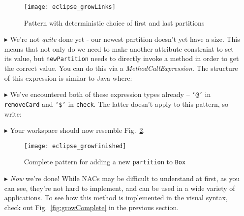 \begin{itemize}
\begin{figure}[htp]
\begin{center}
  \texttt{[image: eclipse\_growLinks]}
  \caption{Pattern  with deterministic choice of first and last partitions}
  \label{fig:growAllLinks}
\end{center}
\end{figure}

\item[$\blacktriangleright$] We're not \emph{quite} done yet - our newest partition doesn't yet have a size. This means that not only do we need to make
another attribute constraint to set its value, but \texttt{newPartition} needs to directly invoke a method in order to get the correct value. You can do this
via a \emph{MethodCallExpression}. The structure of this expression is similar to Java where:

\item[$\blacktriangleright$] We've encountered both of these expression types already -- \texttt{`@'} in \texttt{removeCard} and \texttt{`\$'} in
\texttt{check}. The latter doesn't apply to this pattern, so write: 

\item[$\blacktriangleright$] Your workspace should now resemble Fig.~\ref{fig:patternComplete}.

\vspace{0.5cm}

\begin{figure}[htp]
\begin{center}
  \texttt{[image: eclipse\_growFinished]}
  \caption{Complete pattern for adding a new \texttt{partition} to \texttt{Box}}
  \label{fig:patternComplete}
\end{center}
\end{figure}

\vspace{0.5cm}

\item[$\blacktriangleright$] \emph{Now} we're done! While NACs may be difficult to understand at first, as you can see, they're not hard to implement, and
can be used in a wide variety of applications. To see how this method is implemented in the visual syntax, check out Fig.~\ref{fig:growComplete} in the
previous section.

\end{itemize}